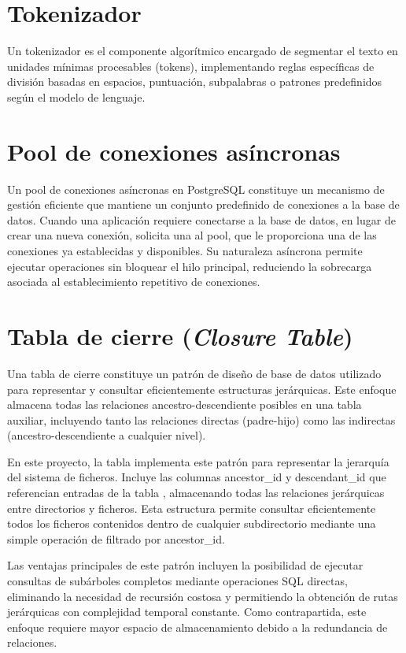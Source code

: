 \section{Tokenizador}
\label{anexo:tokenizer}
Un tokenizador es el componente algorítmico encargado de segmentar el texto en unidades mínimas procesables (tokens), implementando reglas específicas de división basadas en espacios, puntuación, subpalabras o patrones predefinidos según el modelo de lenguaje.

\section{Pool de conexiones asíncronas}
\label{anexo:pool}
Un pool de conexiones asíncronas en PostgreSQL constituye un mecanismo de gestión eficiente que mantiene un conjunto predefinido de conexiones a la base de datos. Cuando una aplicación requiere conectarse a la base de datos, en lugar de crear una nueva conexión, solicita una al pool, que le proporciona una de las conexiones ya establecidas y disponibles. Su naturaleza asíncrona permite ejecutar operaciones sin bloquear el hilo principal, reduciendo la sobrecarga asociada al establecimiento repetitivo de conexiones.

\section{Tabla de cierre (\textit{Closure Table})}
\label{anexo:closure_table}
Una tabla de cierre constituye un patrón de diseño de base de datos utilizado para representar y consultar eficientemente estructuras jerárquicas. Este enfoque almacena todas las relaciones ancestro-descendiente posibles en una tabla auxiliar, incluyendo tanto las relaciones directas (padre-hijo) como las indirectas (ancestro-descendiente a cualquier nivel).

En este proyecto, la tabla  implementa este patrón para representar la jerarquía del sistema de ficheros. Incluye las columnas ancestor\_id y descendant\_id que referencian entradas de la tabla , almacenando todas las relaciones jerárquicas entre directorios y ficheros. Esta estructura permite consultar eficientemente todos los ficheros contenidos dentro de cualquier subdirectorio mediante una simple operación de filtrado por ancestor\_id.

Las ventajas principales de este patrón incluyen la posibilidad de ejecutar consultas de subárboles completos mediante operaciones SQL directas, eliminando la necesidad de recursión costosa y permitiendo la obtención de rutas jerárquicas con complejidad temporal constante. Como contrapartida, este enfoque requiere mayor espacio de almacenamiento debido a la redundancia de relaciones.


